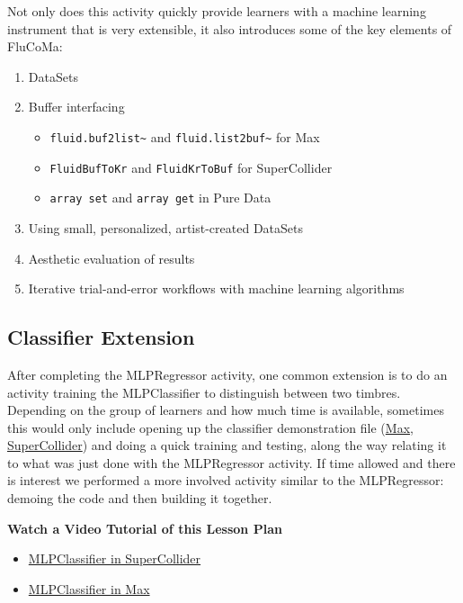 \documentclass{article}
\providecommand{\tightlist}{%
  \setlength{\itemsep}{0pt}\setlength{\parskip}{0pt}}
\begin{document}
Not only does this activity quickly provide learners with a machine
learning instrument that is very extensible, it also introduces some of
the key elements of FluCoMa:

\begin{enumerate}
\def\labelenumi{\arabic{enumi}.}
\tightlist
\item
  DataSets
\item
  Buffer interfacing

  \begin{itemize}
  \tightlist
  \item
    \texttt{fluid.buf2list\textasciitilde{}} and
    \texttt{fluid.list2buf\textasciitilde{}} for Max
  \item
    \texttt{FluidBufToKr} and \texttt{FluidKrToBuf} for SuperCollider
  \item
    \texttt{array\ set} and \texttt{array\ get} in Pure Data
  \end{itemize}
\item
  Using small, personalized, artist-created DataSets
\item
  Aesthetic evaluation of results
\item
  Iterative trial-and-error workflows with machine learning algorithms
\end{enumerate}

\subsection{Classifier Extension}\label{classifier-extension}

After completing the MLPRegressor activity, one common extension is to
do an activity training the MLPClassifier to distinguish between two timbres. Depending on the group of
learners and how much time is available, sometimes this would only
include opening up the classifier demonstration file
(\href{https://learn.flucoma.org/examples/classification-video-demo.maxpat}{Max},
\href{https://learn.flucoma.org/examples/classification-video-demo.scd}{SuperCollider})
and doing a quick training and testing, along the way relating it to
what was just done with the MLPRegressor activity. If time allowed and
there is interest we performed a more involved activity similar to the
MLPRegressor: demoing the code and then building it together.

\textbf{Watch a Video Tutorial of this Lesson Plan}

\begin{itemize}
\tightlist
\item
  \href{https://www.youtube.com/watch?v=Y1cHmtbQPSk}{MLPClassifier in
  SuperCollider}
\item
  \href{https://www.youtube.com/watch?v=cjk9oHw7PQg}{MLPClassifier in
  Max}
\end{itemize}
\end{document}
